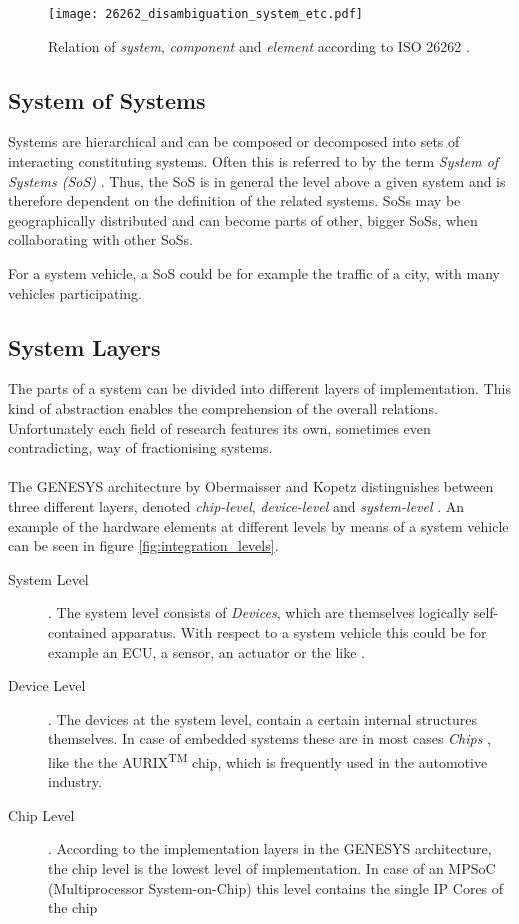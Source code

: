 \begin{figure}[!htbp]
\centering
\texttt{[image: 26262\_disambiguation\_system\_etc.pdf]}

\caption{Relation of \emph{system}, \emph{component} and \emph{element} according to ISO 26262 \cite{iso26262:course1}.}
\label{fig:26262_disambiguation}
\end{figure}


\subsection{System of Systems}
Systems are hierarchical and can be composed or decomposed into sets of interacting constituting systems. Often this is referred to by the term \emph{System of Systems (SoS)} \cite[p.7]{genesys}. Thus, the SoS is in general the level above a given system and is therefore dependent on the definition of the related systems. SoSs may be geographically distributed and can become parts of other, bigger SoSs, when collaborating with other SoSs.

For a system vehicle, a SoS could be for example the traffic of a city, with many vehicles participating.


\subsection{System Layers}
\label{ch:system_layers}
The parts of a system can be divided into different layers of implementation. This kind of abstraction enables the comprehension of the overall relations. Unfortunately each field of research features its own, sometimes even contradicting, way of fractionising systems.
\\
\\
The GENESYS architecture by Obermaisser and Kopetz distinguishes between three different layers, denoted \emph{chip-level}, \emph{device-level} and \emph{system-level} \cite[p.44]{genesys}. An example of the hardware elements at different levels by means of a system vehicle can be seen in figure \ref{fig:integration_levels}.
\begin{description}
\item [System Level] .
The system level consists of \emph{Devices}, which are themselves logically self-contained apparatus. With respect to a system vehicle this could be for example an ECU, a sensor, an actuator or the like \cite[p.45]{genesys}.
\item [Device Level] .
The devices at the system level, contain a certain internal structures themselves. In case of embedded systems these are in most cases \emph{Chips} \cite[p.45]{genesys}, like the the AURIX\textsuperscript{TM} chip, which is frequently used in the automotive industry.
\item [Chip Level] .
According to the implementation layers in the GENESYS architecture, the chip level is the lowest level of implementation. In case of an MPSoC (Multiprocessor System-on-Chip) this level contains the single IP Cores of the chip \cite[p.46]{genesys}
\end{description}

